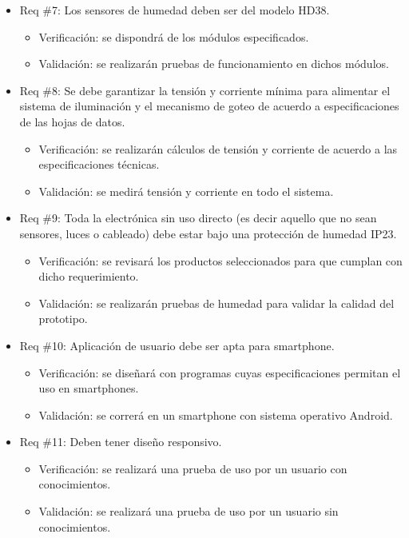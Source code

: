 \documentclass[
11pt, %
]{charter}
\begin{document}
\begin{itemize}
\item Req \#7: Los sensores de humedad deben ser del modelo HD38.
\begin{itemize}
	\item Verificación: se dispondrá de los módulos especificados.
	\item Validación: se realizarán pruebas de funcionamiento en dichos módulos.
\end{itemize}

\item Req \#8: Se debe garantizar la tensión y corriente mínima para alimentar el sistema de iluminación y el mecanismo de goteo de acuerdo a especificaciones de las hojas de datos.
\begin{itemize}
	\item Verificación: se realizarán cálculos de tensión y corriente de acuerdo a las especificaciones técnicas.
	\item Validación: se medirá tensión y corriente en todo el sistema.
\end{itemize}

\item Req \#9: Toda la electrónica sin uso directo (es decir aquello que no sean sensores, luces o cableado) debe estar bajo una protección de humedad IP23.
\begin{itemize}
	\item Verificación: se revisará los productos seleccionados para que cumplan con dicho requerimiento.
	\item Validación: se realizarán pruebas de humedad para validar la calidad del prototipo.
\end{itemize}

\item Req \#10: Aplicación de usuario debe ser apta para smartphone.
\begin{itemize}
	\item Verificación: se diseñará con programas cuyas especificaciones permitan el uso en smartphones.
	\item Validación: se correrá en un smartphone con sistema operativo Android.
\end{itemize}

\item Req \#11: Deben tener diseño responsivo.
\begin{itemize}
	\item Verificación: se realizará una prueba de uso por un usuario con conocimientos.
	\item Validación: se realizará una prueba de uso por un usuario sin conocimientos.
\end{itemize}


\end{itemize}
\end{document}
